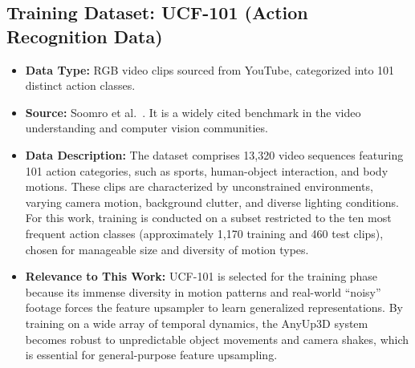 \subsection*{Training Dataset: UCF-101 (Action Recognition Data)}
\begin{itemize}
    \item \textbf{Data Type:} RGB video clips sourced from YouTube, categorized into 101 distinct action classes.
    \item \textbf{Source:} Soomro et al.~\cite{soomro2012ucf101}. It is a widely cited benchmark in the video understanding and computer vision communities.
    \item \textbf{Data Description:} The dataset comprises 13,320 video sequences featuring 101 action categories, such as sports, human-object interaction, and body motions. These clips are characterized by unconstrained environments, varying camera motion, background clutter, and diverse lighting conditions. For this work, training is conducted on a subset restricted to the ten most frequent action classes (approximately 1,170 training and 460 test clips), chosen for manageable size and diversity of motion types.
    \item \textbf{Relevance to This Work:} UCF-101 is selected for the training phase because its immense diversity in motion patterns and real-world ``noisy'' footage forces the feature upsampler to learn generalized representations. By training on a wide array of temporal dynamics, the AnyUp3D system becomes robust to unpredictable object movements and camera shakes, which is essential for general-purpose feature upsampling.
\end{itemize}

